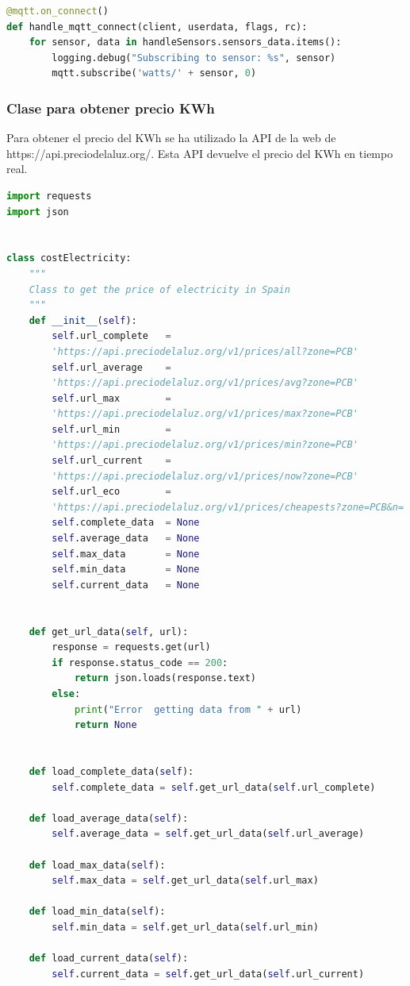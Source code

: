 \begin{titlepage}
\begin{lstlisting}[language=python]
@mqtt.on_connect()
def handle_mqtt_connect(client, userdata, flags, rc):
	for sensor, data in handleSensors.sensors_data.items():
		logging.debug("Subscribing to sensor: %s", sensor)
		mqtt.subscribe('watts/' + sensor, 0)
\end{lstlisting}

\subsubsection{Clase para obtener precio KWh}
Para obtener el precio del KWh se ha utilizado la API de la web de https://api.preciodelaluz.org/. Esta API devuelve el precio del KWh en tiempo real.
\begin{lstlisting}[language=python]
import requests
import json


class costElectricity:
    """
    Class to get the price of electricity in Spain
    """
    def __init__(self):
        self.url_complete   = 
		'https://api.preciodelaluz.org/v1/prices/all?zone=PCB'
        self.url_average    = 
		'https://api.preciodelaluz.org/v1/prices/avg?zone=PCB'
        self.url_max        = 
		'https://api.preciodelaluz.org/v1/prices/max?zone=PCB'
        self.url_min        = 
		'https://api.preciodelaluz.org/v1/prices/min?zone=PCB'
        self.url_current    = 
		'https://api.preciodelaluz.org/v1/prices/now?zone=PCB'
        self.url_eco        = 
		'https://api.preciodelaluz.org/v1/prices/cheapests?zone=PCB&n='
        self.complete_data  = None
        self.average_data   = None
        self.max_data       = None
        self.min_data       = None
        self.current_data   = None

    
    def get_url_data(self, url):
        response = requests.get(url)
        if response.status_code == 200:
            return json.loads(response.text)
        else:
            print("Error  getting data from " + url)
            return None


    def load_complete_data(self):
        self.complete_data = self.get_url_data(self.url_complete)

    def load_average_data(self):
        self.average_data = self.get_url_data(self.url_average)
    
    def load_max_data(self):
        self.max_data = self.get_url_data(self.url_max)
    
    def load_min_data(self):
        self.min_data = self.get_url_data(self.url_min)
    
    def load_current_data(self):
        self.current_data = self.get_url_data(self.url_current)


\end{lstlisting}
\end{titlepage}
